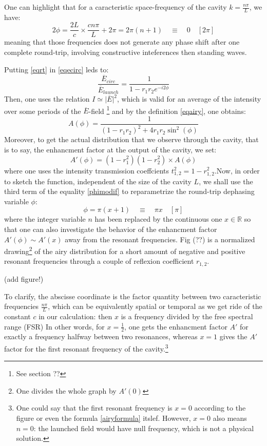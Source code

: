 \documentclass[12pt]{report}
\begin{document}
One can highlight that for a caracteristic space-frequency of the cavity $k=\frac{n\pi}{L}$, we have:
\begin{equation}
\label{phimodif}
2\phi = \frac{2L}{c} \times \frac{cn\pi}{L} + 2\pi = 2\pi(n + 1) \quad \equiv \quad 0 \quad [2\pi]
\end{equation}
meaning that those frequencies does not generate any phase shift after one complete round-trip, involving constructive inteferences then standing waves.

Putting \eqref{eqrt} in \eqref{eqecirc} leds to:
\begin{equation}
\frac{\overline{E}_{circ}}{\overline{E}_{launch}} = \frac{1}{1 - r_1 r_2 e^{-i2\phi}}
\end{equation}
Then, one uses the relation $ I \simeq \vert\overline{E}\vert^2$, which is valid for an average of the intensity over some periods of the $\overline{E}$-field \footnote{See section ??} and by the definition \eqref{eqairy}, one obtains:
\begin{equation}
\label{airyformula}
A(\phi) = \frac{1}{(1 - r_1 r_2)^2 + 4 r_1 r_2 \sin^2(\phi)}
\end{equation}
Moreover, to get the actual distribution that we observe through the cavity, that is to say, the enhancment factor at the output of the cavity, we set:
\begin{equation}
\label{airyformulasec}
A'(\phi) = (1-r_1^2)(1-r_2^2)\times A(\phi)
\end{equation}
where one uses the intensity transmission coeffcients $t_{1,2}^2 = 1-r_{1,2}^2$.Now, in order to sketch the function, independent of the size of the cavity $L$, we shall use the third term of the equality \eqref{phimodif} to reparametrize the round-trip dephasing variable $\phi$:
\begin{equation}
\label{phidef}
\phi = \pi(x+1) \quad \equiv \quad \pi x \quad [\pi]
\end{equation}
where the integer variable $n$ has been replaced by the continuous one $x \in \mathbb{R}$ so that one can also investigate the behavior of the enhancment factor $A'(\phi) \sim A'(x)$ away from the resonant frequencies. Fig (??) is a normalized drawing\footnote{One divides the whole graph by $A'(0)$} of the airy distribution for a short amount of negative and positive resonant frequencies through a couple of reflexion coefficient $r_{1,2}$. 

(add figure!)

To clarify, the abscisse coordinate is the factor quantity between two caracteristic frequencies $\frac{n\pi}{L}$, which can be equivalently spatial or temporal as we get ride of the constant $c$ in our calculation: then $x$ is a frequency divided by the free spectral range (FSR) In other words, for $x=\frac{1}{2}$, one gets the enhancment factor $A'$ for exactly a frequency halfway between two resonances, whereas $x=1$ gives the $A'$ factor for the first resonant frequency of the cavity.\footnote{One could say that the first resonant frequency is $x=0$ according to the figure or even the formula \eqref{airyformula} itslef. However, $x=0$ also means $n=0$: the launched field would have null frequency, which is not a physical solution.}
\end{document}
